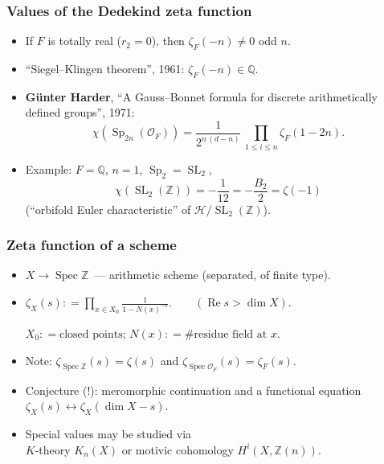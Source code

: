 \documentclass[handout]{beamer}
\newcommand{\personality}[1]{{\bf #1}}
\newcommand{\ZZ}{\mathbb{Z}}
\newcommand{\QQ}{\mathbb{Q}}
\DeclareMathOperator{\SL}{SL}
\DeclareMathOperator{\Sp}{Sp}
\renewcommand{\O}{\mathcal{O}}
\newcommand{\dfn}{\mathrel{\mathop:}=}
\DeclareMathOperator{\Spec}{Spec}
\begin{document}

\begin{frame}
  \frametitle{Values of the Dedekind zeta function}

  \begin{itemize}
  \item<2-> If $F$ is totally real ($r_2 = 0$), then $\zeta_F (-n) \ne 0$
    odd $n$.

  \item<3-> ``Siegel--Klingen theorem'', 1961: $\zeta_F (-n) \in \QQ$.

  \item<4-> \personality{G\"unter Harder}, ``A Gauss--Bonnet formula for
    discrete arithmetically defined groups'', 1971:
    $$\chi (\Sp_{2n} (\O_F)) = \frac{1}{2^{n\,(d-n)}} \, \prod_{1\le i\le n} \zeta_F (1-2n).$$

  \item<5-> Example: $F = \QQ$, $n = 1$, $\Sp_2 = \SL_2$,
    $$\chi (\SL_2 (\ZZ)) = -\frac{1}{12} = -\frac{B_2}{2} = \zeta (-1)$$
    (``orbifold Euler characteristic'' of $\mathcal{H}/\SL_2 (\ZZ)$).
  \end{itemize}
\end{frame}


\begin{frame}
  \frametitle{Zeta function of a scheme}

  \begin{itemize}
  \item<2-> $X \to \Spec \ZZ$~--- arithmetic scheme (separated, of finite type).

  \item<3-> $\zeta_X (s) \dfn \prod_{x\in X_0} \frac{1}{1 - N (x)^{-s}}. \quad\quad (\operatorname{Re} s > \dim X)$.

    $X_0 \dfn \text{closed points}$; $N (x) \dfn \#\text{residue field at }x$.

  \item<4-> Note: $\zeta_{\Spec\ZZ} (s) = \zeta (s)$ and $\zeta_{\Spec\O_F} (s) = \zeta_F (s)$.

  \item<5-> Conjecture (!): meromorphic continuation and a functional equation
    $\zeta_X (s) \leftrightarrow \zeta_X (\dim X - s)$.

  \item<6-> Special values may be studied via\\
    $K$-theory $K_n (X)$ or motivic cohomology $H^i (X, \ZZ (n))$.
  \end{itemize}
\end{frame}
\end{document}
